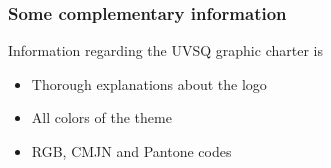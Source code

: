 \documentclass[10pt,hidelinks]{beamer}
\newcommand{\backupend}{
   \addtocounter{framenumberappendix}{-\value{framenumber}}
   \addtocounter{framenumber}{\value{framenumberappendix}} 
}
\newcommand{\colorhref}[2]{\href{#1}{\color{bleublason}{#2}}}
\begin{document}
\begin{frame}
  \frametitle{Some complementary information}
  
  Information regarding the UVSQ graphic charter is \colorhref{http://www.uvsq.fr/jsp/saisie/liste_fichiergw.jsp?OBJET=DOCUMENT&CODE=1429111529765&LANGUE=0}{available here}

  \begin{itemize}
  \item Thorough explanations about the logo
  \item All colors of the theme
  \item RGB, CMJN and Pantone codes
  \end{itemize}

  \vfill

  \begin{flushright}
    \hyperlink{compinfhome}{}
    \hypertarget{compinf}{}
  \end{flushright}

\end{frame}
\backupend
\end{document}
